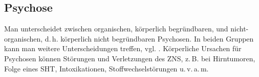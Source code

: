 \subsection{Psychose}
\label{topic:psychose}

Man unterscheidet zwischen organischen, körperlich
begründbaren, und nicht-organischen, d.\,h. körperlich nicht
begründbaren Psychosen. In beiden Gruppen kann man weitere
Unterscheidungen treffen, vgl.
. Körperliche Ursachen für Psychosen
können Störungen und Verletzungen des ZNS, z.\,B. bei
Hirntumoren, Folge eines SHT, Intoxikationen,
Stoffwechselstörungen u.\,v.\,a.\,m. 



